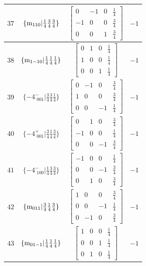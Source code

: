 \documentclass[fleqn,8pt]{jsarticle}
\begin{document}
\begin{longtable}{cccc}
$ 37 $ & $ \{{\rm m}_{110}|\frac{1}{4} \frac{3}{4} \frac{3}{4}\} $ & $ \begin{bmatrix} 0 & -1 & 0 & \frac{1}{4} \\ -1 & 0 & 0 & \frac{3}{4} \\ 0 & 0 & 1 & \frac{3}{4} \end{bmatrix} $ & $ -1 $ \\ \hline
$ 38 $ & $ \{{\rm m}_{1-10}|\frac{1}{4} \frac{1}{4} \frac{1}{4}\} $ & $ \begin{bmatrix} 0 & 1 & 0 & \frac{1}{4} \\ 1 & 0 & 0 & \frac{1}{4} \\ 0 & 0 & 1 & \frac{1}{4} \end{bmatrix} $ & $ -1 $ \\ \hline
$ 39 $ & $ \{-4^{-}_{\,\,001}|\frac{3}{4} \frac{3}{4} \frac{1}{4}\} $ & $ \begin{bmatrix} 0 & -1 & 0 & \frac{3}{4} \\ 1 & 0 & 0 & \frac{3}{4} \\ 0 & 0 & -1 & \frac{1}{4} \end{bmatrix} $ & $ -1 $ \\ \hline
$ 40 $ & $ \{-4^{+}_{\,\,001}|\frac{3}{4} \frac{1}{4} \frac{3}{4}\} $ & $ \begin{bmatrix} 0 & 1 & 0 & \frac{3}{4} \\ -1 & 0 & 0 & \frac{1}{4} \\ 0 & 0 & -1 & \frac{3}{4} \end{bmatrix} $ & $ -1 $ \\ \hline
$ 41 $ & $ \{-4^{-}_{\,\,100}|\frac{1}{4} \frac{3}{4} \frac{3}{4}\} $ & $ \begin{bmatrix} -1 & 0 & 0 & \frac{1}{4} \\ 0 & 0 & -1 & \frac{3}{4} \\ 0 & 1 & 0 & \frac{3}{4} \end{bmatrix} $ & $ -1 $ \\ \hline
$ 42 $ & $ \{{\rm m}_{011}|\frac{3}{4} \frac{1}{4} \frac{3}{4}\} $ & $ \begin{bmatrix} 1 & 0 & 0 & \frac{3}{4} \\ 0 & 0 & -1 & \frac{1}{4} \\ 0 & -1 & 0 & \frac{3}{4} \end{bmatrix} $ & $ -1 $ \\ \hline
$ 43 $ & $ \{{\rm m}_{01-1}|\frac{1}{4} \frac{1}{4} \frac{1}{4}\} $ & $ \begin{bmatrix} 1 & 0 & 0 & \frac{1}{4} \\ 0 & 0 & 1 & \frac{1}{4} \\ 0 & 1 & 0 & \frac{1}{4} \end{bmatrix} $ & $ -1 $ \\ \hline

\end{longtable}
\end{document}
